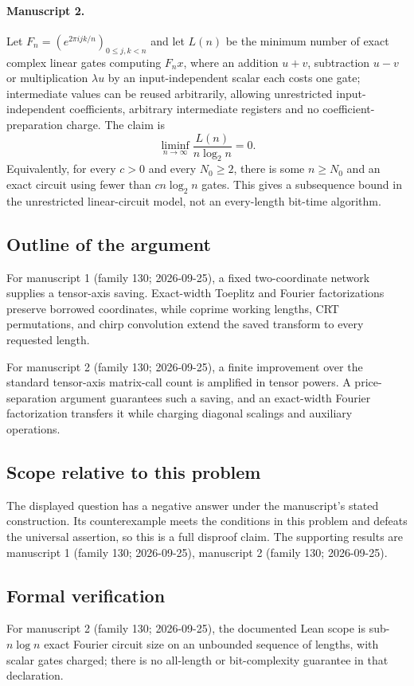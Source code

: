 \documentclass[11pt]{article}
\begin{document}
\paragraph{Manuscript 2.}
Let $F_n=(e^{2\pi i jk/n})_{0\le j,k<n}$ and let $L(n)$ be the minimum number of exact complex linear gates computing $F_nx$, where an addition $u+v$, subtraction $u-v$ or multiplication $\lambda u$ by an input-independent scalar each costs one gate; intermediate values can be reused arbitrarily, allowing unrestricted input-independent coefficients, arbitrary intermediate registers and no coefficient-preparation charge. The claim is
\[
 \liminf_{n\to\infty}\frac{L(n)}{n\log_2n}=0.
\]
Equivalently, for every $c>0$ and every $N_0\ge2$, there is some $n\ge N_0$ and an exact circuit using fewer than $cn\log_2n$ gates. This gives a subsequence bound in the unrestricted linear-circuit model, not an every-length bit-time algorithm.

\subsection{Outline of the argument}
For manuscript 1 (family 130; 2026-09-25), a fixed two-coordinate network supplies a tensor-axis saving. Exact-width Toeplitz and Fourier factorizations preserve borrowed coordinates, while coprime working lengths, CRT permutations, and chirp convolution extend the saved transform to every requested length.

For manuscript 2 (family 130; 2026-09-25), a finite improvement over the standard tensor-axis matrix-call count is amplified in tensor powers. A price-separation argument guarantees such a saving, and an exact-width Fourier factorization transfers it while charging diagonal scalings and auxiliary operations.

\subsection{Scope relative to this problem}
The displayed question has a negative answer under the manuscript's stated construction. Its counterexample meets the conditions in this problem and defeats the universal assertion, so this is a full disproof claim. The supporting results are manuscript 1 (family 130; 2026-09-25), manuscript 2 (family 130; 2026-09-25).

\subsection{Formal verification}
For manuscript 2 (family 130; 2026-09-25), the documented Lean scope is sub-$n\log n$ exact Fourier circuit size on an unbounded sequence of lengths, with scalar gates charged; there is no all-length or bit-complexity guarantee in that declaration.
\end{document}
